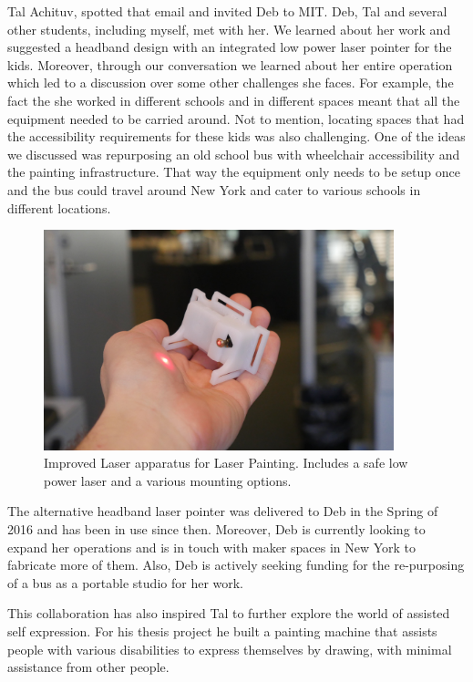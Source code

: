 Tal Achituv, spotted that email and invited Deb to MIT. Deb, Tal and several other students, including myself, met with her. We learned about her work and suggested a headband design with an integrated low power laser pointer for the kids. Moreover, through our conversation we learned about her entire operation which led to a discussion over some other challenges she faces. For example, the fact the she worked in different schools and in different spaces meant that all the equipment needed to be carried around. Not to mention, locating spaces that had the accessibility requirements for these kids was also challenging. One of the ideas we discussed was repurposing an old school bus with wheelchair accessibility and the painting infrastructure. That way the equipment only needs to be setup once and the bus could travel around New York and cater to various schools in different locations. 

   \begin{figure}[thpb]
      \centering
      \includegraphics[width=4in]{figures/new-laser.jpg}
      \caption{Improved Laser apparatus for Laser Painting. Includes a safe low power laser and a various mounting options.}
      \label{new-laser}
   \end{figure}


The alternative headband laser pointer was delivered to Deb in the Spring of 2016 and has been in use since then. Moreover, Deb is currently looking to expand her operations and is in touch with maker spaces in New York to fabricate more of them. Also, Deb is actively seeking funding for the re-purposing of a bus as a portable studio for her work. 

This collaboration has also inspired Tal to further explore the world of assisted self expression.  For his thesis project he built a painting machine that assists people with various disabilities to express themselves by drawing, with minimal assistance from other people\cite{projexpress}. 

